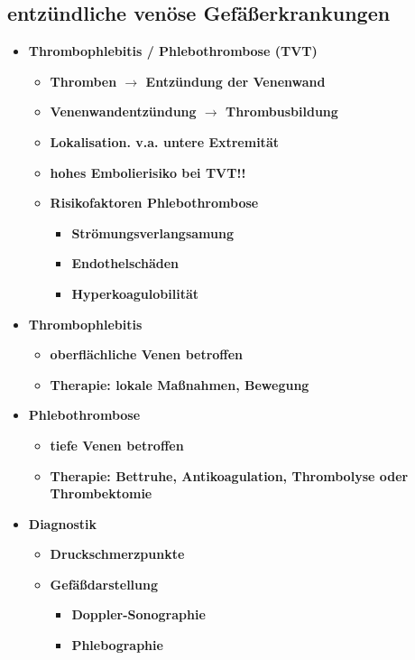 	\subsection{entzündliche venöse Gefäßerkrankungen}
		\begin{itemize}
			\item \textbf{Thrombophlebitis / Phlebothrombose (TVT)}
				\begin{itemize}
					\item \textbf{Thromben $\rightarrow$ Entzündung der Venenwand}
					\item \textbf{Venenwandentzündung $\rightarrow$ Thrombusbildung}
					\item \textbf{Lokalisation. v.a. untere Extremität}
					\item \textbf{hohes Embolierisiko bei TVT!!}
					\item \textbf{Risikofaktoren Phlebothrombose}
						\begin{itemize}
							\item \textbf{Strömungsverlangsamung}
							\item \textbf{Endothelschäden}
							\item \textbf{Hyperkoagulobilität}
						\end{itemize}
				\end{itemize}
			\item \textbf{Thrombophlebitis}
				\begin{itemize}
					\item \textbf{oberflächliche Venen betroffen}
					\item \textbf{Therapie: lokale Maßnahmen, Bewegung}
				\end{itemize}
			\item \textbf{Phlebothrombose}
				\begin{itemize}
					\item \textbf{tiefe Venen betroffen}
					\item \textbf{Therapie: Bettruhe, Antikoagulation, Thrombolyse oder Thrombektomie}
				\end{itemize}
			\item \textbf{Diagnostik}
				\begin{itemize}
					\item \textbf{Druckschmerzpunkte}
					\item \textbf{Gefäßdarstellung}
						\begin{itemize}
							\item \textbf{Doppler-Sonographie}
							\item \textbf{Phlebographie}
						\end{itemize}
				\end{itemize}
		\end{itemize}
